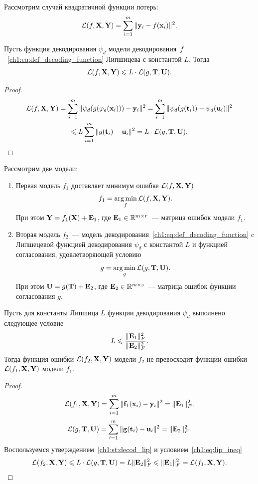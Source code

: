 Рассмотрим случай квадратичной функции потерь:
\[
\mathcal{L}(f, \mathbf{X}, \mathbf{Y}) = \sum_{i=1}^m \| \mathbf{y}_i - f(\mathbf{x}_i) \|^2.
\]

\begin{statement}
	\label{ch1:st:decod_lip}
	Пусть функция декодирования $\psi_d$ модели декодирования~$f$~\eqref{ch1:eq:def_decoding_function} Липшицева с константой $L$. Тогда 
	\[
		\mathcal{L}(f, \mathbf{X}, \mathbf{Y}) \leqslant L \cdot \mathcal{L}(g, \mathbf{T}, \mathbf{U}).
	\]
\end{statement}

\begin{proof}
	\begin{multline*}
		\mathcal{L}(f, \mathbf{X}, \mathbf{Y}) = \sum_{i=1}^m \| \psi_d (g (\varphi_e(\mathbf{x}_i))) - \mathbf{y}_i \|^2  = \sum_{i=1}^m \| \psi_d (g (\mathbf{t}_i)) - \psi_d (\mathbf{u}_i) \|^2 \\\leqslant L \sum_{i=1}^m \| g (\mathbf{t}_i) - \mathbf{u}_i \|^2 = L \cdot \mathcal{L}(g, \mathbf{T}, \mathbf{U}).
	\end{multline*}
\end{proof}
\begin{theorem}
	Рассмотрим две модели:
	\begin{enumerate}
		\item Первая модель $f_1$ доставляет минимум ошибке $\mathcal{L}(f, \mathbf{X}, \mathbf{Y})$
		\[
		f_1 = \mathop{\arg \min}\limits_f \mathcal{L}(f, \mathbf{X}, \mathbf{Y}).
		\]
		При этом $\mathbf{Y} = f_1(\mathbf{X}) + \mathbf{E}_1$, где $\mathbf{E}_1 \in \mathbb{R}^{m \times r}$~--- матрица ошибок модели $f_1$.
		
		\item Вторая модель $f_2$~--- модель декодирования~\eqref{ch1:eq:def_decoding_function} c Липшецевой функцией декодирования $\psi_d$ с константой $L$ и функцией согласования, удовлетворяющей условию
		\[
			g = \mathop{\arg \min}\limits_g \mathcal{L}(g, \mathbf{T}, \mathbf{U}).
		\]
		При этом $\mathbf{U} = g(\mathbf{T}) + \mathbf{E}_2$, где $\mathbf{E}_2 \in \mathbb{R}^{m \times s}$~--- матрица ошибок функции согласования $g$.
	\end{enumerate}
	Пусть для константы Липшица $L$ функции декодирования $\psi_d$ выполнено следующее условие
	\begin{equation}
		L \leqslant \frac{\|\mathbf{E}_1\|_F^2}{\|\mathbf{E}_2\|_F^2}.
		\label{ch1:eq:lip_ineq}
	\end{equation}
	Тогда функция ошибки $\mathcal{L}(f_2, \mathbf{X}, \mathbf{Y})$ модели $f_2$ не превосходит функции ошибки $\mathcal{L}(f_1, \mathbf{X}, \mathbf{Y})$ модели $f_1$.
\end{theorem}

\begin{proof}
	\[
		\mathcal{L} (f_1, \mathbf{X}, \mathbf{Y}) = \sum_{i=1}^m \| \mathbf{f}_1(\mathbf{x}_i) - \mathbf{y}_i\|^2 = \| \mathbf{E}_1 \|_F^2.
	\]
	\[
	\mathcal{L} (g, \mathbf{T}, \mathbf{U}) = \sum_{i=1}^m \| \mathbf{g}(\mathbf{t}_i) - \mathbf{u}_i\|^2 = \| \mathbf{E}_2 \|_F^2.
	\]
	Воспользуемся утверждением~\ref{ch1:st:decod_lip} и условием~\eqref{ch1:eq:lip_ineq}
	\[
		\mathcal{L} (f_2, \mathbf{X}, \mathbf{Y}) \leqslant L \cdot \mathcal{L}(g, \mathbf{T}, \mathbf{U}) = L \| \mathbf{E}_2 \|_F^2 \leqslant \| \mathbf{E}_1 \|_F^2 = \mathcal{L}(f_1, \mathbf{X}, \mathbf{Y}).
	\]
\end{proof}

